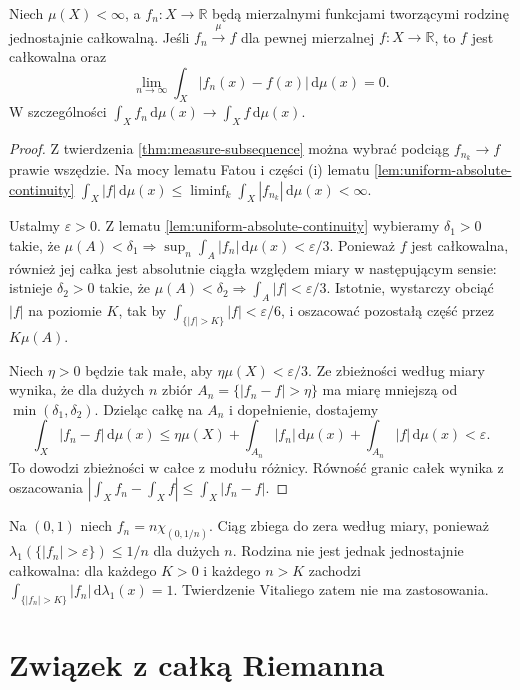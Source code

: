 \begin{twierdzenie}
\label{thm:vitali-l1}
Niech $\mu(X)<\infty$, a $f_n:X\to\mathbb R$ będą
mierzalnymi funkcjami tworzącymi rodzinę
jednostajnie całkowalną. Jeśli
$f_n\xrightarrow{\mu}f$ dla pewnej mierzalnej
$f:X\to\mathbb R$, to $f$ jest całkowalna oraz
\[
\lim_{n\to\infty}\int_X|f_n(x)-f(x)|\,\mathrm d\mu(x)=0.
\]
W szczególności $\int_Xf_n\,\mathrm d\mu(x)\to
\int_Xf\,\mathrm d\mu(x)$.
\end{twierdzenie}
\begin{proof}
Z twierdzenia \ref{thm:measure-subsequence}
można wybrać podciąg $f_{n_k}\to f$ prawie wszędzie.
Na mocy lematu Fatou i części (i) lematu
\ref{lem:uniform-absolute-continuity}
$\int_X|f|\,\mathrm d\mu(x)\le
\liminf_k\int_X|f_{n_k}|\,\mathrm d\mu(x)<\infty$.

Ustalmy $\varepsilon>0$. Z lematu
\ref{lem:uniform-absolute-continuity} wybieramy
$\delta_1>0$ takie, że
$\mu(A)<\delta_1\Rightarrow
\sup_n\int_A|f_n|\,\mathrm d\mu(x)<\varepsilon/3$.
Ponieważ $f$ jest całkowalna, również jej całka
jest absolutnie ciągła względem miary w następującym
sensie: istnieje $\delta_2>0$ takie, że
$\mu(A)<\delta_2\Rightarrow\int_A|f|<\varepsilon/3$.
Istotnie, wystarczy obciąć $|f|$ na poziomie $K$,
tak by $\int_{\{|f|>K\}}|f|<\varepsilon/6$,
i oszacować pozostałą część przez $K\mu(A)$.

Niech $\eta>0$ będzie tak małe, aby
$\eta\mu(X)<\varepsilon/3$. Ze zbieżności według
miary wynika, że dla dużych $n$ zbiór
$A_n=\{|f_n-f|>\eta\}$ ma miarę mniejszą od
$\min(\delta_1,\delta_2)$. Dzieląc całkę na
$A_n$ i dopełnienie, dostajemy
\[
\int_X|f_n-f|\,\mathrm d\mu(x)
\le\eta\mu(X)+\int_{A_n}|f_n|\,\mathrm d\mu(x)
+\int_{A_n}|f|\,\mathrm d\mu(x)<\varepsilon.
\]
To dowodzi zbieżności w całce z modułu różnicy.
Równość granic całek wynika z oszacowania
$|\int_X f_n-\int_X f|\le\int_X|f_n-f|$.
\end{proof}

\begin{przyklad}
Na $(0,1)$ niech $f_n=n\chi_{(0,1/n)}$.
Ciąg zbiega do zera według miary, ponieważ
$\lambda_1(\{|f_n|>\varepsilon\})\le1/n$
dla dużych $n$. Rodzina nie jest jednak jednostajnie
całkowalna: dla każdego $K>0$ i każdego $n>K$
zachodzi
$\int_{\{|f_n|>K\}}|f_n|\,\mathrm d\lambda_1(x)=1$.
Twierdzenie Vitaliego zatem nie ma zastosowania.
\end{przyklad}

\section{Związek z całką Riemanna}

